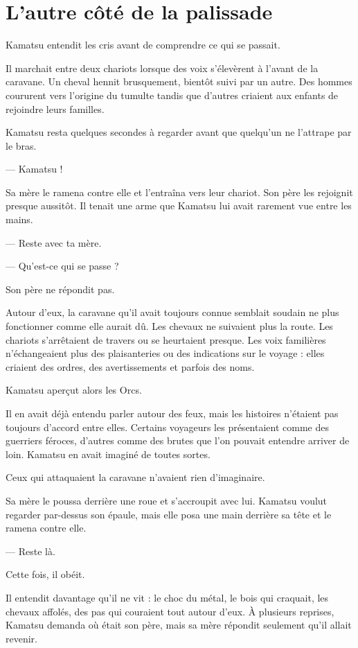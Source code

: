 \chapter{L'autre côté de la palissade}
\label{chap:lautre-cote-de-la-palissade}

Kamatsu entendit les cris avant de comprendre ce qui se passait.

Il marchait entre deux chariots lorsque des voix s'élevèrent à l'avant de la
caravane. Un cheval hennit brusquement, bientôt suivi par un autre. Des hommes
coururent vers l'origine du tumulte tandis que d'autres criaient aux enfants
de rejoindre leurs familles.

Kamatsu resta quelques secondes à regarder avant que quelqu'un ne l'attrape par
le bras.

— Kamatsu !

Sa mère le ramena contre elle et l'entraîna vers leur chariot. Son père les
rejoignit presque aussitôt. Il tenait une arme que Kamatsu lui avait rarement
vue entre les mains.

— Reste avec ta mère.

— Qu'est-ce qui se passe ?

Son père ne répondit pas.

Autour d'eux, la caravane qu'il avait toujours connue semblait soudain ne plus
fonctionner comme elle aurait dû. Les chevaux ne suivaient plus la route. Les
chariots s'arrêtaient de travers ou se heurtaient presque. Les voix familières
n'échangeaient plus des plaisanteries ou des indications sur le voyage : elles
criaient des ordres, des avertissements et parfois des noms.

Kamatsu aperçut alors les Orcs.

Il en avait déjà entendu parler autour des feux, mais les histoires n'étaient
pas toujours d'accord entre elles. Certains voyageurs les présentaient comme
des guerriers féroces, d'autres comme des brutes que l'on pouvait entendre
arriver de loin. Kamatsu en avait imaginé de toutes sortes.

Ceux qui attaquaient la caravane n'avaient rien d'imaginaire.

Sa mère le poussa derrière une roue et s'accroupit avec lui. Kamatsu voulut
regarder par-dessus son épaule, mais elle posa une main derrière sa tête et le
ramena contre elle.

— Reste là.

Cette fois, il obéit.

Il entendit davantage qu'il ne vit : le choc du métal, le bois qui craquait,
les chevaux affolés, des pas qui couraient tout autour d'eux. À plusieurs
reprises, Kamatsu demanda où était son père, mais sa mère répondit seulement
qu'il allait revenir.

